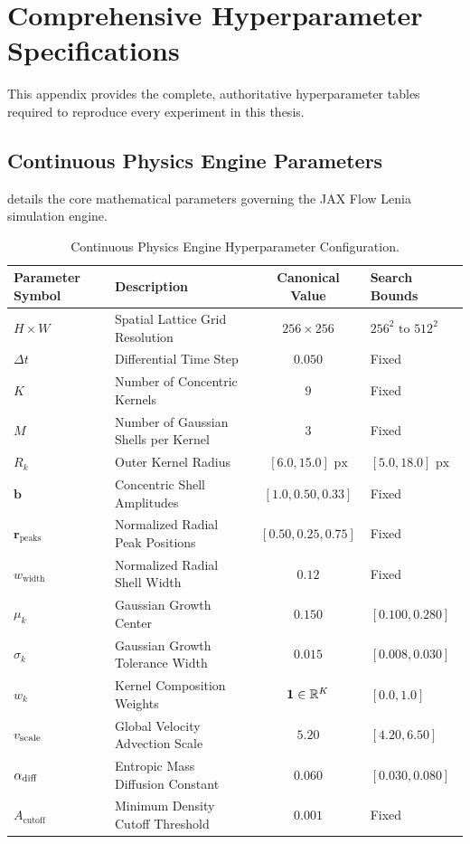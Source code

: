 \section{Comprehensive Hyperparameter Specifications}
\label{sec:appendix_hyperparameters}

This appendix provides the complete, authoritative hyperparameter tables required to reproduce every experiment in this thesis.

\subsection{Continuous Physics Engine Parameters}
\label{subsec:app_param_physics}

 details the core mathematical parameters governing the JAX Flow Lenia simulation engine.

\begin{table}[htbp]
\centering
\footnotesize
\caption{Continuous Physics Engine Hyperparameter Configuration.}
\label{tab:app_physics_hyperparams}
\begin{tabularx}{\textwidth}{l X c p{3.4cm}}
\toprule
\textbf{Parameter Symbol} & \textbf{Description} & \textbf{Canonical Value} & \textbf{Search Bounds} \\
\midrule
$H \times W$ & Spatial Lattice Grid Resolution & $256 \times 256$ & $256^2 \text{ to } 512^2$ \\
$\Delta t$ & Differential Time Step & $0.050$ & Fixed \\
$K$ & Number of Concentric Kernels & $9$ & Fixed \\
$M$ & Number of Gaussian Shells per Kernel & $3$ & Fixed \\
$R_k$ & Outer Kernel Radius & $[6.0, 15.0]\text{ px}$ & $[5.0, 18.0]\text{ px}$ \\
$\mathbf{b}$ & Concentric Shell Amplitudes & $[1.0, 0.50, 0.33]$ & Fixed \\
$\mathbf{r}_{\text{peaks}}$ & Normalized Radial Peak Positions & $[0.50, 0.25, 0.75]$ & Fixed \\
$w_{\text{width}}$ & Normalized Radial Shell Width & $0.12$ & Fixed \\
$\mu_k$ & Gaussian Growth Center & $0.150$ & $[0.100, 0.280]$ \\
$\sigma_k$ & Gaussian Growth Tolerance Width & $0.015$ & $[0.008, 0.030]$ \\
$w_k$ & Kernel Composition Weights & $\mathbf{1} \in \mathbb{R}^K$ & $[0.0, 1.0]$ \\
$v_{\text{scale}}$ & Global Velocity Advection Scale & $5.20$ & $[4.20, 6.50]$ \\
$\alpha_{\text{diff}}$ & Entropic Mass Diffusion Constant & $0.060$ & $[0.030, 0.080]$ \\
$A_{\text{cutoff}}$ & Minimum Density Cutoff Threshold & $0.001$ & Fixed \\
\bottomrule
\end{tabularx}
\end{table}

